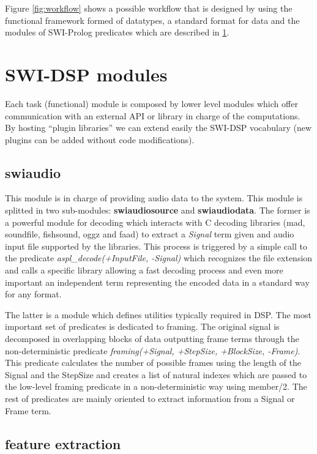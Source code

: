\documentclass[runningheads]{llncs}
\begin{document}
Figure \ref{fig:workflow} shows a possible workflow that is designed by using the functional framework formed of datatypes, a standard format for data and the modules of SWI-Prolog predicates which are described in \ref{sec:modules}.

\section{SWI-DSP modules}\label{sec:modules}

Each task (functional) module is composed by lower level modules which offer communication with an external API or library in charge of the computations. By hosting ``plugin libraries'' we can extend easily the SWI-DSP vocabulary (new plugins can be added without code modifications).

\subsection{swiaudio}\label{subsec:swiaudio}

This module is in charge of providing audio data to the system. This module is splitted in two sub-modules: \textbf{swiaudiosource} and \textbf{swiaudiodata}. The former is a powerful module for decoding which interacts with C decoding libraries (mad, soundfile, fishsound, oggz and faad) to extract a \textit{Signal} term given and audio input file supported by the libraries. This process is triggered by a simple call to the predicate \textit{aspl\_decode(+InputFile, -Signal)} which recognizes the file extension and calls a specific library allowing a fast decoding process and even more important an independent term representing the encoded data in a standard way for any format.

The latter is a module which defines utilities typically required in DSP. The most important set of predicates is dedicated to framing. The original signal is decomposed in overlapping blocks of data outputting frame terms through the non-deterministic predicate \textit{framing(+Signal, +StepSize, +BlockSize, -Frame)}. This predicate calculates the number of possible frames using the length of the Signal and the StepSize and creates a list of natural indexes which are passed to the low-level framing predicate in a non-deterministic way using member/2. The rest of predicates are mainly oriented to extract information from a Signal or Frame term.

\subsection{feature extraction}\label{subsec:swivamp}
\end{document}
